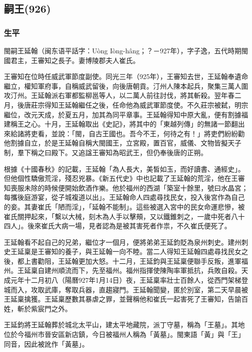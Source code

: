 
\subsection{嗣王\tiny(926)}

\subsubsection{生平}

閩嗣王延翰（闽东语平話字：Uòng Iòng-hâng；？－927年），字子逸，五代時期閩國君主，王審知之長子。妻博陵郡夫人崔氏。

王審知在位時任威武軍節度副使。同光三年（925年），王審知去世，王延翰奉遺命繼立，權知軍府事，自稱威武留後，向後唐朝貢。汀州人陳本起兵，聚集三萬人圍攻汀州。王延翰派右軍都監柳邕等人，以二萬人前往討伐，將其斬殺。翌年春二月，後唐莊宗得知王延翰繼任之後，任命他為威武軍節度使。不久莊宗被弑，明宗繼位，改元天成，於夏五月，加其為同平章事。王延翰得知中原大亂，便有割據福建稱王之心。十月，王延翰取出《史記》，將其中的「東越列傳」的無諸一節翻出來給諸將吏看，並說：「閩，自古王國也。吾今不王，何待之有！」將吏們紛紛勸他割據自立，於是王延翰自稱大閩國王，立宮殿，置百官，威儀、文物皆擬天子制，羣下稱之曰殿下。又追諡王審知為昭武王，但仍奉後唐的正朔。

根據《十國春秋》的記載，王延翰「為人長大，美皙如玉，而好讀書、通經史」。但他個性驕傲荒淫，殘忍兇暴。《新五代史》中也記載了王延翰的荒淫，他在王審知喪服未除的時候便開始飲酒作樂。他於福州的西湖「築室十餘里，號曰水晶宮；每攜後庭游宴，從子城複道以出」。王延翰命人四處尋找民女，投入後宮作為自己的妾。其妻崔氏「陋而淫」，「延翰不能制」。這些被選入宮中的民女命運悲慘，被崔氏關押起來，「繫以大械，刻木為人手以擊頰，又以鐵錐刺之，一歲中死者八十四人」。後來崔氏大病一場，見者認為是被其害死者作祟，不久崔氏便死了。

王延翰看不起自己的兄弟，繼位才一個月，便將弟弟王延鈞貶為泉州刺史。建州刺史王延稟是王審知的養子，與王延翰一向不睦。當二人得知王延翰四處尋找民女之後，都上書勸阻，王延翰更加大怒。十二月，王延鈞與王延稟便聯手反叛，進軍福州。王延稟自建州順流而下，先至福州。福州指揮使陳陶率軍抵抗，兵敗自殺。天成元年十二月初八（陽曆927年1月14日）夜，王延稟率壯士百餘人，從西門架梯登城而入，攻取武庫，奪取兵器，直趨寢門。王延翰聞變，匿於別室，第二天早晨被王延稟擒獲。王延稟歷數其暴虐之罪，並聲稱他和崔氏一起害死了王審知，告諭百姓，斬於紫宸門之外。

王延鈞將王延翰葬於城北太平山，建太平地藏院，派丁守墓，稱為「王墓」。其地位於今福州市晉安區新店鎮，今日被福州人稱為「黃墓」。閩東語「黃」與「王」同音，因此被訛作「黃墓」。

